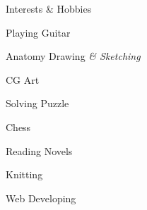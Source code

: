 \begin{rSection}{Interests \& Hobbies}
	\begin{rSubsection}{}{}{}{}
		\item Playing Guitar
		\item Anatomy Drawing \em\& Sketching
		\item CG Art
		\item Solving Puzzle
		\item Chess
		\item Reading Novels
		\item Knitting
		\item Web Developing
		\\\\\\\\\\\\\\\\\\\\\\
	\end{rSubsection}
\end{rSection}